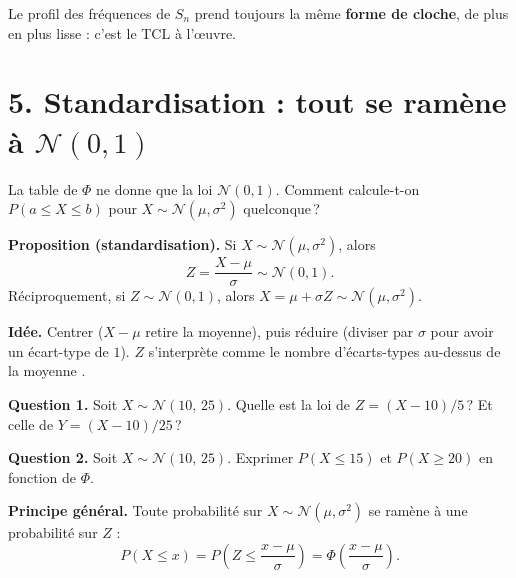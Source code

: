 Le profil des fréquences de $S_n$ prend toujours la même
\textbf{forme de cloche}, de plus en plus lisse : c'est le TCL à
l'\oe uvre.

\section*{5. Standardisation : tout se ramène à $\mathcal{N}(0,1)$}

La table de $\Phi$ ne donne que la loi $\mathcal{N}(0,1)$. Comment
calcule-t-on $P(a\le X\le b)$ pour $X\sim\mathcal{N}(\mu,\sigma^2)$
quelconque\,?

\begin{mdframed}[backgroundcolor=ThemeLight, linecolor=Theme,
  linewidth=1pt, innertopmargin=8pt, innerbottommargin=8pt, nobreak=true]
\textbf{Proposition (standardisation).}
Si $X\sim\mathcal{N}(\mu,\sigma^2)$, alors
\[
  \boxed{\,Z=\dfrac{X-\mu}{\sigma}\sim\mathcal{N}(0,1).\,}
\]
Réciproquement, si $Z\sim\mathcal{N}(0,1)$, alors
$X=\mu+\sigma Z\sim\mathcal{N}(\mu,\sigma^2)$.
\end{mdframed}

\textbf{Idée.}
Centrer ($X-\mu$ retire la moyenne), puis réduire (diviser par
$\sigma$ pour avoir un écart-type de $1$). $Z$ s'interprète comme
\og le nombre d'écarts-types au-dessus de la moyenne \fg.

\medskip

\textbf{Question 1.} Soit $X\sim\mathcal{N}(10,\,25)$. Quelle est
la loi de $Z=(X-10)/5$\,? Et celle de $Y=(X-10)/25$\,?


\medskip

\textbf{Question 2.} Soit $X\sim\mathcal{N}(10,\,25)$. Exprimer
$P(X\le 15)$ et $P(X\ge 20)$ en fonction de $\Phi$.


\textbf{Principe général.}
Toute probabilité sur $X\sim\mathcal{N}(\mu,\sigma^2)$ se ramène
à une probabilité sur $Z$ :
\[
  P(X\le x) = P\!\left(Z\le \dfrac{x-\mu}{\sigma}\right)
  = \Phi\!\left(\dfrac{x-\mu}{\sigma}\right).
\]


